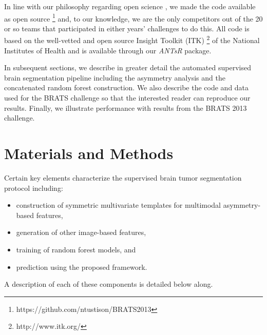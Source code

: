 \documentclass[final,5p,times,twocolumn]{elsarticle}
\begin{document}
In line with our philosophy regarding open science \citep{tustison2013,ince2012}, 
we made the code available as open source%
\footnote{
https://github.com/ntustison/BRATS2013
}
and, to our knowledge, we are the only competitors out of the 20 or so teams 
that participated in either years' challenges to do this.  All code is based
on the well-vetted and open source Insight Toolkit (ITK)%
\footnote{
http://www.itk.org/
} 
of the National Institutes of Health and is available through our \textit{ANTsR} 
package.

In subsequent sections, we describe in greater detail the automated 
supervised brain segmentation pipeline including the asymmetry
analysis and the concatenated random forest construction.  We also
describe the code and data used for the BRATS challenge so that 
the interested reader can reproduce our results.  Finally, we 
illustrate performance with results from the BRATS 2013 challenge.




\section{Materials and Methods}

Certain key elements characterize the supervised brain tumor segmentation
protocol including:
\begin{itemize}
  \item construction of symmetric multivariate templates for multimodal 
        asymmetry-based features,
  \item generation of other image-based features,
  \item training of random forest models, and
  \item prediction using the proposed framework.
\end{itemize}
A description of each of these components is detailed below along.
\end{document}
